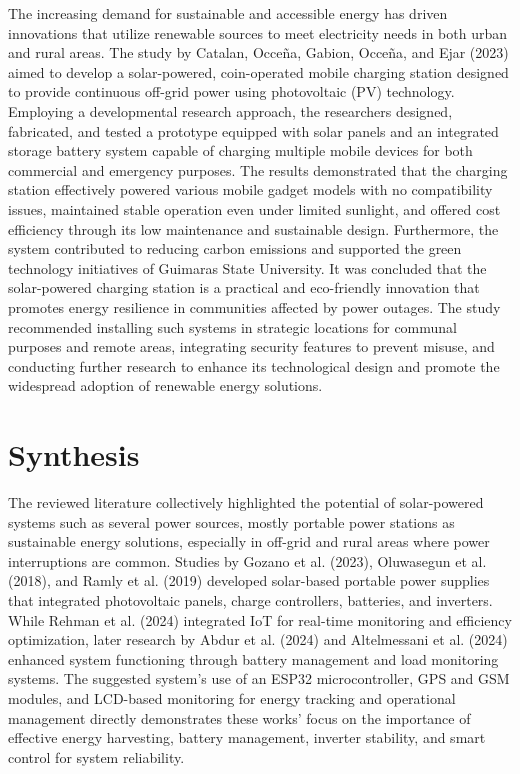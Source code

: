 {The increasing demand for sustainable and accessible energy has driven innovations that utilize renewable sources to meet electricity needs in both urban and rural areas. The study by Catalan, Occeña, Gabion, Occeña, and Ejar (2023) aimed to develop a solar-powered, coin-operated mobile charging station designed to provide continuous off-grid power using photovoltaic (PV) technology. Employing a developmental research approach, the researchers designed, fabricated, and tested a prototype equipped with solar panels and an integrated storage battery system capable of charging multiple mobile devices for both commercial and emergency purposes. The results demonstrated that the charging station effectively powered various mobile gadget models with no compatibility issues, maintained stable operation even under limited sunlight, and offered cost efficiency through its low maintenance and sustainable design. Furthermore, the system contributed to reducing carbon emissions and supported the green technology initiatives of Guimaras State University. It was concluded that the solar-powered charging station is a practical and eco-friendly innovation that promotes energy resilience in communities affected by power outages. The study recommended installing such systems in strategic locations for communal purposes and remote areas, integrating security features to prevent misuse, and conducting further research to enhance its technological design and promote the widespread adoption of renewable energy solutions.

\section{Synthesis}

The reviewed literature collectively highlighted the potential of solar-powered systems such as several power sources, mostly portable power stations as sustainable energy solutions, especially in off-grid and rural areas where power interruptions are common. Studies by Gozano et al. (2023), Oluwasegun et al. (2018), and Ramly et al. (2019) developed solar-based portable power supplies that integrated photovoltaic panels, charge controllers, batteries, and inverters. While Rehman et al. (2024) integrated IoT for real-time monitoring and efficiency optimization, later research by Abdur et al. (2024) and Altelmessani et al. (2024) enhanced system functioning through battery management and load monitoring systems. The suggested system’s use of an ESP32 microcontroller, GPS and GSM modules, and LCD-based monitoring for energy tracking and operational management directly demonstrates these works’ focus on  the importance of effective energy harvesting, battery management, inverter stability, and smart control for system reliability.

}
